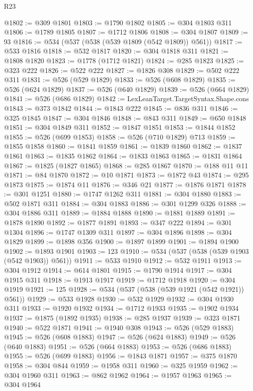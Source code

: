 \begin{lexlean}{R23}
\begin{coremodule}
@1802 := @309 @1801
@1803 := @1790 @1802
@1805 := @304 @1803 @311
@1806 := @1789 @1805
@1807 := @1712 @1806
@1808 := @304 @1807
@1809 := 93
@1816 := @534 (@537 (@538 (@539 @1809 (@542 @1809)) @561))
@1817 := @533 @1816
@1818 := @532 @1817
@1820 := @304 @1818 @311
@1821 := @1808 @1820
@1823 := @1778 (@1712 @1821)
@1824 := @285 @1823
@1825 := @323 @222
@1826 := @522 @222
@1827 := @1826 @308
@1829 := @502 @222 @311
@1831 := @526 (@529 @1829)
@1833 := @526 (@608 @1829)
@1835 := @526 (@624 @1829)
@1837 := @526 (@640 @1829)
@1839 := @526 (@664 @1829)
@1841 := @526 (@686 @1829)
@1842 := LexLeanTarget.TargetSyntax.Shape.cons
@1843 := @373 @1842
@1844 := @1843 @222
@1845 := @836 @311
@1846 := @325 @1845
@1847 := @304 @1846
@1848 := @843 @311
@1849 := @650 @1848
@1851 := @304 @1849 @311
@1852 := @1847 @1851
@1853 := @1844 @1852
@1855 := @526 (@699 @1853)
@1858 := @526 (@710 @1829) @713
@1859 := @1855 @1858
@1860 := @1841 @1859
@1861 := @1839 @1860
@1862 := @1837 @1861
@1863 := @1835 @1862
@1864 := @1833 @1863
@1865 := @1831 @1864
@1867 := @1825 (@1827 @1865)
@1868 := @285 @1867
@1870 := @188 @11 @11
@1871 := @84 @1870
@1872 := @10 @1871
@1873 := @1872 @43
@1874 := @295 @1873
@1875 := @1874 @11
@1876 := @346 @21
@1877 := @1876 @1871
@1878 := @301 @1251
@1880 := @1747 @1262 @311
@1881 := @304 @1880
@1883 := @502 @1871 @311
@1884 := @304 @1883
@1886 := @301 @1299 @326
@1888 := @304 @1886 @311
@1889 := @1884 @1888
@1890 := @1881 @1889
@1891 := @1878 @1890
@1892 := @1877 @1891
@1893 := @347 @222
@1894 := @301 @1304
@1896 := @1747 @1309 @311
@1897 := @304 @1896
@1898 := @304 @1829
@1899 := @1898 @356
@1900 := @1897 @1899
@1901 := @1894 @1900
@1902 := @1893 @1901
@1903 := 123
@1910 := @534 (@537 (@538 (@539 @1903 (@542 @1903)) @561))
@1911 := @533 @1910
@1912 := @532 @1911
@1913 := @304 @1912
@1914 := @614 @1801
@1915 := @1790 @1914
@1917 := @304 @1915 @311
@1918 := @1913 @1917
@1919 := @1712 @1918
@1920 := @304 @1919
@1921 := 125
@1928 := @534 (@537 (@538 (@539 @1921 (@542 @1921)) @561))
@1929 := @533 @1928
@1930 := @532 @1929
@1932 := @304 @1930 @311
@1933 := @1920 @1932
@1934 := @1712 @1933
@1935 := @1902 @1934
@1937 := @1875 (@1892 @1935)
@1938 := @285 @1937
@1939 := @323 @1871
@1940 := @522 @1871
@1941 := @1940 @308
@1943 := @526 (@529 @1883)
@1945 := @526 (@608 @1883)
@1947 := @526 (@624 @1883)
@1949 := @526 (@640 @1883)
@1951 := @526 (@664 @1883)
@1953 := @526 (@686 @1883)
@1955 := @526 (@699 @1883)
@1956 := @1843 @1871
@1957 := @375 @1870
@1958 := @304 @844
@1959 := @1958 @311
@1960 := @325 @1959
@1962 := @304 @1960 @311
@1963 := @862 @1962
@1964 := @1957 @1963
@1965 := @304 @1964

\end{coremodule}
\end{lexlean}
